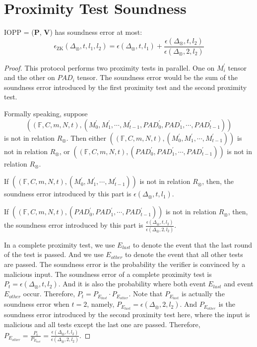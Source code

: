 \section{Proximity Test Soundness}

\begin{lemma}
\label{lemma:szkpctc-soundness}


IOPP = ($\textbf{P}$, $\textbf{V}$) has soundness error at most:
$$
    \epsilon_{\text{ZK}}(\Delta_\otimes, t, l_1, l_2) = \epsilon(\Delta_\otimes, t, l_1) + \frac{\epsilon(\Delta_\otimes, t, l_2)}{\epsilon(\Delta_\otimes, 2, l_2)}
$$

\end{lemma}
\begin{proof}


This protocol performs two proximity tests in parallel. One on $M_i^\prime$ tensor and the other on $PAD_i$ tensor. The soundness error would be the sum of the soundness error introduced by the first proximity test and the second proximity test.


Formally speaking, suppose 
$$
    ((\mathbb{F}, C, m, N, t), (M_0^{\prime}, M_1^{\prime}, \cdots, M_{t-1}^{\prime}, PAD_0^{\prime}, PAD_1^{\prime}, \cdots, PAD_{t-1}^{\prime}))
$$ 
is not in relation $R_\otimes$. Then either $((\mathbb{F}, C, m, N, t), (M_0^{\prime}, M_1^{\prime}, \cdots, M_{t-1}^{\prime}))$ is not in relation $R_\otimes$, 
or $((\mathbb{F}, C, m, N, t), (PAD_0^{\prime}, PAD_1^{\prime}, \cdots, PAD_{t-1}^{\prime}))$ is not in relation $R_\otimes$.

If $((\mathbb{F}, C, m, N, t), (M_0^{\prime}, M_1^{\prime}, \cdots, M_{t-1}^{\prime}))$ is not in relation $R_\otimes$, then, the soundness error introduced by this part is $\epsilon(\Delta_\otimes, t, l_1)$. 

If $((\mathbb{F}, C, m, N, t), (PAD_0^{\prime}, PAD_1^{\prime}, \cdots, PAD_{t-1}^{\prime}))$ is not in relation $R_\otimes$, then, the soundness error introduced by this part is $\frac{\epsilon(\Delta_\otimes, t, l_2)}{\epsilon(\Delta_\otimes, 2, l_2)}$.

In a complete proximity test, we use $E_{last}$ to denote the event that the last round of the test is passed. And we use $E_{other}$ to denote the event that all other tests are passed.
The soundness error is the probability the verifier is convinced by a malicious input.
The soundness error of a complete proximity test is $P_t = \epsilon(\Delta_\otimes, t, l_2)$. And it is also the probability where both event $E_{last}$ and event $E_{other}$ occur. Therefore, $P_t = P_{E_{last}} \cdot P_{E_{other}}$. Note that $P_{E_{last}}$ is actually the soundness error when $t=2$, namely, $P_{E_{last}} = \epsilon(\Delta_\otimes, 2, l_2)$. And $P_{E_{other}}$ is the soundness error introduced by the second proximity test here, where the input is malicious and all tests except the last one are passed. Therefore, $P_{E_{other}} = \frac{P_{t}}{P_{E_{last}}} = \frac{\epsilon(\Delta_\otimes, t, l_2)}{\epsilon(\Delta_\otimes, 2, l_2)}$.

\end{proof}


